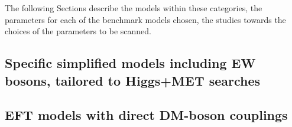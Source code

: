 The following Sections describe the models within these categories,
the parameters for each of the benchmark models chosen,
the studies towards the choices of the parameters to be scanned.

\subsection{Specific simplified models including EW bosons, tailored to Higgs+MET searches}
\label{sec:monoHiggs}


\subsection{EFT models with direct DM-boson couplings}
\label{sec:EFT_models_with_direct_DM_boson_couplings}


